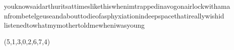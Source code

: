 
youknowsaidarthuritsattimeslikethiswhenimtrappedinavogonairlockwithama
\\
nfrombetelgeuseandabouttodieofasphyxiationindeepspacethatireallywishid
\\
listenedtowhatmymothertoldmewheniwasyoung
    
    (5,1,3,0,2,6,7,4)

    
